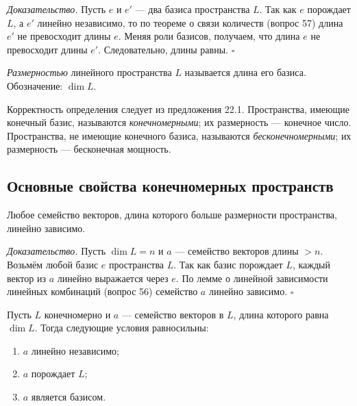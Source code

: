 \documentclass[a4paper,12pt]{article}
\theoremstyle{definition}
\theoremstyle{plain}
\theoremstyle{remark}
\begin{document}
	\medskip
	\textit{Доказательство.}
	Пусть \( e \) и \( e' \) — два базиса пространства \( L \). Так как \( e \) порождает \( L \), а \( e' \) линейно независимо, то по теореме о связи количеств (вопрос 57) длина \( e' \) не превосходит длины \( e \). Меняя роли базисов, получаем, что длина \( e \) не превосходит длины \( e' \). Следовательно, длины равны. \hfill \(\square\)
	
	\begin{tcolorbox}[colback=blue!5, colframe=blue!40!black, title=Определение 22.2]
		\textit{Размерностью} линейного пространства \( L \) называется длина его базиса. Обозначение: \( \dim L \).
	\end{tcolorbox}
	
	Корректность определения следует из предложения 22.1. Пространства, имеющие конечный базис, называются \textit{конечномерными}; их размерность — конечное число. Пространства, не имеющие конечного базиса, называются \textit{бесконечномерными}; их размерность — бесконечная мощность.
	
	\subsection{Основные свойства конечномерных пространств}
	
	\begin{tcolorbox}[colback=green!5, colframe=green!50!black, title=Предложение 22.3]
		Любое семейство векторов, длина которого больше размерности пространства, линейно зависимо.
	\end{tcolorbox}
	
	\medskip
	\textit{Доказательство.}
	Пусть \( \dim L = n \) и \( a \) — семейство векторов длины \( > n \). Возьмём любой базис \( e \) пространства \( L \). Так как базис порождает \( L \), каждый вектор из \( a \) линейно выражается через \( e \). По лемме о линейной зависимости линейных комбинаций (вопрос 56) семейство \( a \) линейно зависимо. \hfill \(\square\)
	
	\begin{tcolorbox}[colback=green!5, colframe=green!50!black, title=Предложение 22.4]
		Пусть \( L \) конечномерно и \( a \) — семейство векторов в \( L \), длина которого равна \( \dim L \). Тогда следующие условия равносильны:
		\begin{enumerate}
			\item \( a \) линейно независимо;
			\item \( a \) порождает \( L \);
			\item \( a \) является базисом.
		\end{enumerate}
	\end{tcolorbox}
	
\end{document}

